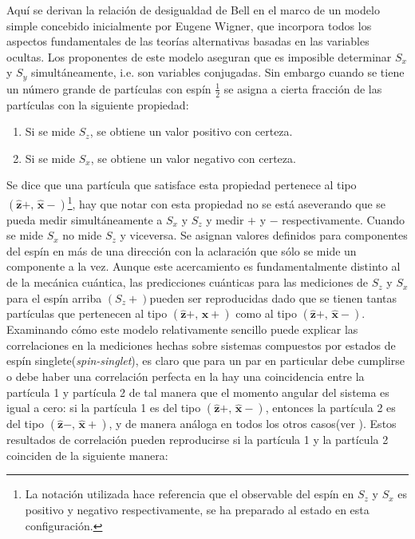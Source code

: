 \documentclass[a4paper]{article}
\begin{document}
Aquí se derivan la relación de desigualdad de Bell en el marco de un modelo simple concebido inicialmente por Eugene Wigner, que incorpora todos los aspectos fundamentales de las teorías alternativas basadas en las variables ocultas. Los proponentes de este modelo aseguran que es imposible determinar $S_x$ y $S_y$ simultáneamente, i.e. son variables conjugadas. Sin embargo cuando se tiene un número grande de partículas con espín $\frac{1}{2}$ se asigna a cierta fracción de las partículas con la siguiente propiedad:
\begin{enumerate}
\item Si se mide $S_z$, se obtiene un valor positivo con certeza.
\item Si se mide $S_x$, se obtiene un valor negativo con certeza.
\end{enumerate}
Se dice que una partícula que satisface esta propiedad pertenece al tipo $(\mathbf{\hat{z}}+,\, \mathbf{\hat{x}}-)$\footnote{La notación utilizada hace referencia que el observable del espín en $S_z$ y $S_x$ es positivo y negativo respectivamente, se ha preparado al estado en esta configuración.}, hay que notar con esta propiedad no se está aseverando que se pueda medir simultáneamente a $S_x$ y $S_z$ y medir $+$ y $-$ respectivamente. Cuando se mide $S_x$ no mide $S_z$ y viceversa. Se asignan valores definidos para componentes del espín en más de una dirección con la aclaración que sólo se mide un componente a la vez. Aunque este acercamiento es fundamentalmente distinto al de la mecánica cuántica, las predicciones cuánticas para las mediciones de $S_z$ y $S_x$ para el espín arriba $(S_z+)$pueden ser reproducidas dado que se tienen tantas partículas que pertenecen al tipo $(\mathbf{\hat{z}}+,\, \mathbf{\hat{x}}+)$ como al tipo $(\mathbf{\hat{z}}+,\, \mathbf{\hat{x}}-)$.\\
Examinando cómo este modelo relativamente sencillo puede explicar las correlaciones en la mediciones hechas sobre sistemas compuestos por estados de espín singlete(\textit{spin-singlet}), es claro que para un par en particular debe cumplirse o debe haber una correlación perfecta en la hay una coincidencia entre la partícula 1 y partícula 2 de tal manera que el momento angular del sistema es igual a cero: si la partícula 1 es del tipo $(\mathbf{\hat{z}}+,\, \mathbf{\hat{x}}-)$, entonces la partícula 2 es del tipo $(\mathbf{\hat{z}}-,\, \mathbf{\hat{x}}+)$, y de manera análoga en todos los otros casos(ver \cite{Sakurai}). Estos resultados de correlación pueden reproducirse si la partícula 1 y la partícula 2 coinciden de la siguiente manera:
\end{document}
